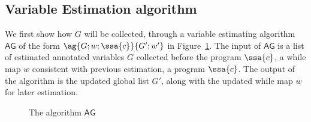 \subsection{Variable Estimation algorithm}
We first show how $G$ will be collected, through a variable estimating algorithm $\mathsf{AG}$ of the form $\ag{G; w; \ssa{c}}{ G'; w'} $ in Figure~\ref{fig:ag}. The input of $\mathsf{AG}$ is a list of estimated annotated variables $G$ collected before the program $\ssa{c}$, a while map $w$ consistent with previous estimation, a program $\ssa{c}$. The output of the algorithm is the updated global list $G'$, along with the updated while map $w$ for later estimation.   
\begin{figure}
 \caption{The algorithm $\mathsf{AG}$ }
    \label{fig:ag}
\end{figure}
